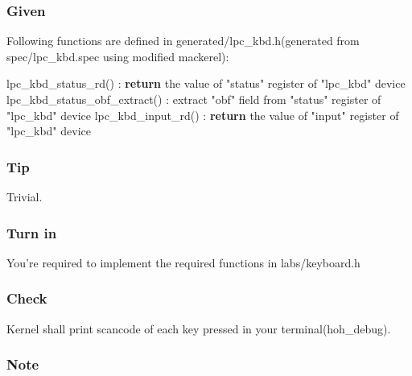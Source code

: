 \documentclass[]{book}
\newenvironment{Shaded}{}{}
\newcommand{\KeywordTok}[1]{\textbf{{#1}}}
\newcommand{\DataTypeTok}[1]{\textcolor[rgb]{0.50,0.00,0.00}{{#1}}}
\newcommand{\StringTok}[1]{\textcolor[rgb]{0.87,0.00,0.00}{{#1}}}
\newcommand{\NormalTok}[1]{{#1}}
\begin{document}
\subsubsection*{Given}\label{given-2}

Following functions are defined in generated/lpc\_kbd.h(generated from
spec/lpc\_kbd.spec using modified mackerel):

\begin{Shaded}
\begin{Highlighting}[]
    \NormalTok{lpc_kbd_status_rd()           : }\KeywordTok{return} \NormalTok{the value of }\StringTok{"status"} \DataTypeTok{register}  \NormalTok{of }\StringTok{"lpc_kbd"} \NormalTok{device}
    \NormalTok{lpc_kbd_status_obf_extract()  : extract }\StringTok{"obf"} \NormalTok{field from }\StringTok{"status"} \DataTypeTok{register}   \NormalTok{of }\StringTok{"lpc_kbd"} \NormalTok{device}
    \NormalTok{lpc_kbd_input_rd()            : }\KeywordTok{return} \NormalTok{the value of }\StringTok{"input"} \DataTypeTok{register} \NormalTok{of }\StringTok{"lpc_kbd"} \NormalTok{device}
\end{Highlighting}
\end{Shaded}

\subsubsection*{Tip}\label{tip-2}

Trivial.

\subsubsection*{Turn in}\label{turn-in-2}

You're required to implement the required functions in labs/keyboard.h

\subsubsection*{Check}\label{check-2}

Kernel shall print scancode of each key pressed in your
terminal(hoh\_debug).

\subsubsection*{Note}\label{note-3}
\end{document}
